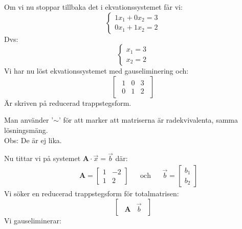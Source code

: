 \begin{Ex}
\begin{elimination}[1]{2}{1.75em}{1.1}
{}
\end{elimination}
Om vi nu stoppar tillbaka det i ekvationssystemet får vi:
\[
    \begin{cases}
        1x_1 + 0x_2 = 3 \\
        0x_1 + 1x_2 = 2
    \end{cases}
\]
Dvs:
\[
    \begin{cases}
        x_1 = 3\\
        x_2 = 2
    \end{cases}
\]
Vi har nu löst ekvationssystemet med gauseliminering och:
    \[
    \begin{bmatrix}
    \begin{array}{cc|c}
    1 & 0 & 3\\
    0 & 1 & 2
    \end{array}
    \end{bmatrix}
    \]
    Är skriven på reducerad trappstegsform.
\end{Ex}

\begin{Rem}
    Man använder '$\sim$' för att marker att matriserna är radekvivalenta, samma lösningsmäng.\\
    Obs: De är ej lika.
\end{Rem}

Nu tittar vi på systemet $\mathbf{A} \cdot \vec{x} = \vec{b}$ där:
\begin{align*}
&&\mathbf{A} = \begin{bmatrix} 1&-2\\1&2 \end{bmatrix}
&&\text{och}
&&\vec{b} = \begin{bmatrix} b_1\\b_2 \end{bmatrix}
\end{align*}
Vi söker en reducerad trappstegsform för totalmatrisen:
\[
\begin{bmatrix}
\begin{array}{c|c}
    \mathbf{A} & \vec{b}
\end{array}
\end{bmatrix}
\]
Vi gauseliminerar:

